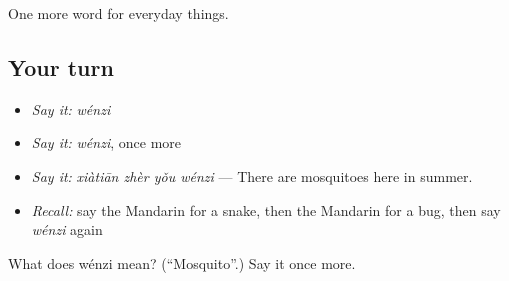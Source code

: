 \begin{grammarlens}[title={What you've built}]
One more word for everyday things.
\end{grammarlens}

\subsection*{Your turn}
\begin{itemize}
\raggedright
  \item \emph{Say it:} \emph{wénzi}
  \item \emph{Say it:} \emph{wénzi}, once more
  \item \emph{Say it:} \emph{xiàtiān zhèr yǒu wénzi} — There are mosquitoes here in summer.
  \item \emph{Recall:} say the Mandarin for a snake, then the Mandarin for a bug, then say \emph{wénzi} again
\end{itemize}

\begin{tcolorbox}[breakable,colback=teal!4,colframe=teal!35!black,title={Before you move on}]
What does wénzi mean? (\textquotedblleft{}Mosquito\textquotedblright{}.) Say it once more.
\end{tcolorbox}
